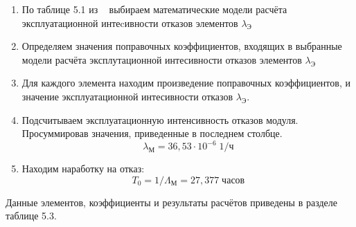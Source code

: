 \begin{enumerate}
\item По таблице 5.1 из ~\cite{Borovikov2010} выбираем математические
модели расчёта эксплуатационной интеcивности отказов элементов
$\lambda_{\text{Э}}$

\item Определяем значения поправочных коэффициентов, входящих в
выбранные модели расчёта эксплутационной интесивности отказов
элементов $\lambda_{\text{Э}}$
\item Для каждого элемента находим произведение поправочных
коэффициентов, и значение эксплуатационной интесивности отказов
$\lambda_{\text{Э}}$.

\item Подсчитываем эксплуатационную интенсивность отказов модуля.
  Просуммировав значения, приведенные в последнем столбце.
  $$\lambda_{\text{М}} = 36,53 \cdot 10^{-6} \; 1/ч$$
  
\item Находим наработку на отказ:
  $$T_0 = 1 / \Lambda_{\text{М}} = 27,377 \; часов$$
\end{enumerate}

Данные элементов, коэффициенты и результаты расчётов приведены в
разделе таблице 5.3.

